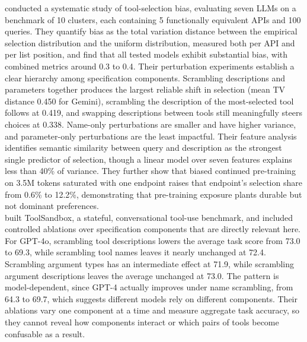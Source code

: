 \textcite{blankenstein2025biasbusters} conducted a systematic study of tool-selection bias, evaluating seven LLMs on a benchmark of 10 clusters, each containing 5 functionally equivalent APIs and 100 queries.
They quantify bias as the total variation distance between the empirical selection distribution and the uniform distribution, measured both per API and per list position, and find that all tested models exhibit substantial bias, with combined metrics around 0.3 to 0.4.
Their perturbation experiments establish a clear hierarchy among specification components.
Scrambling descriptions and parameters together produces the largest reliable shift in selection (mean TV distance 0.450 for Gemini), scrambling the description of the most-selected tool follows at 0.419, and swapping descriptions between tools still meaningfully steers choices at 0.338.
Name-only perturbations are smaller and have higher variance, and parameter-only perturbations are the least impactful.
Their feature analysis identifies semantic similarity between query and description as the strongest single predictor of selection, though a linear model over seven features explains less than 40\% of variance.
They further show that biased continued pre-training on 3.5M tokens saturated with one endpoint raises that endpoint's selection share from 0.6\% to 12.2\%, demonstrating that pre-training exposure plants durable but not dominant preferences.
\\

\textcite{lu2024toolsandbox} built ToolSandbox, a stateful, conversational tool-use benchmark, and included controlled ablations over specification components that are directly relevant here.
For GPT-4o, scrambling tool descriptions lowers the average task score from 73.0 to 69.3, while scrambling tool names leaves it nearly unchanged at 72.4. Scrambling argument types has an intermediate effect at 71.9, while scrambling argument descriptions leaves the average unchanged at 73.0.
The pattern is model-dependent, since GPT-4 actually improves under name scrambling, from 64.3 to 69.7, which suggests different models rely on different components.
Their ablations vary one component at a time and measure aggregate task accuracy, so they cannot reveal how components interact or which pairs of tools become confusable as a result.
\\

